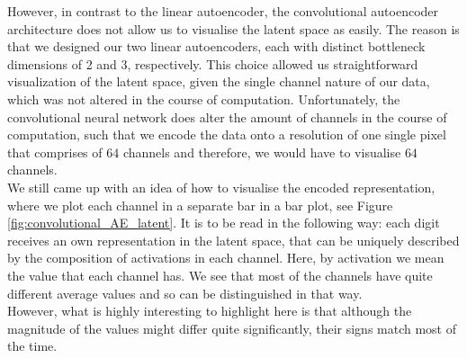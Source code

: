 However, in contrast to the linear autoencoder, the convolutional autoencoder architecture does not allow us to visualise the latent space as easily. The reason is that we designed our two linear autoencoders, each with distinct bottleneck dimensions of 2 and 3, respectively. This choice allowed us straightforward visualization of the latent space, given the single channel nature of our data, which was not altered in the course of computation. Unfortunately, the convolutional neural network does alter the amount of channels in the course of computation, such that we encode the data onto a resolution of one single pixel that comprises of $64$ channels and therefore, we would have to visualise $64$ channels.\\
We still came up with an idea of how to visualise the encoded representation, where we plot each channel in a separate bar in a bar plot, see Figure \ref{fig:convolutional_AE_latent}. It is to be read in the following way: each digit receives an own representation in the latent space, that can be uniquely described by the composition of activations in each channel. Here, by activation we mean the value that each channel has. We see that most of the channels have quite different average values and so can be distinguished in that way.\\
However, what is highly interesting to highlight here is that although the magnitude of the values might differ quite significantly, their signs match most of the time.



